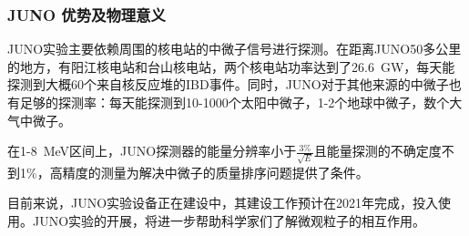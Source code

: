 \documentclass[10pt,a4paper]{article}
\begin{document}
\subsubsection{JUNO 优势及物理意义}\label{sub:7}

JUNO实验主要依赖周围的核电站的中微子信号进行探测。在距离JUNO50多公里的地方，有阳江核电站和台山核电站，两个核电站功率达到了\SI{26.6}{GW}，每天能探测到大概60个来自核反应堆的IBD事件。同时，JUNO对于其他来源的中微子也有足够的探测率：每天能探测到10-1000个太阳中微子，1-2个地球中微子，数个大气中微子。

在1-\SI{8 }{MeV}区间上，JUNO探测器的能量分辨率小于$\frac{3\%}{\sqrt{E}}$且能量探测的不确定度不到1\%，高精度的测量为解决中微子的质量排序问题提供了条件。

目前来说，JUNO实验设备正在建设中，其建设工作预计在2021年完成，投入使用。JUNO实验的开展，将进一步帮助科学家们了解微观粒子的相互作用。

\newpage



\end{document}
